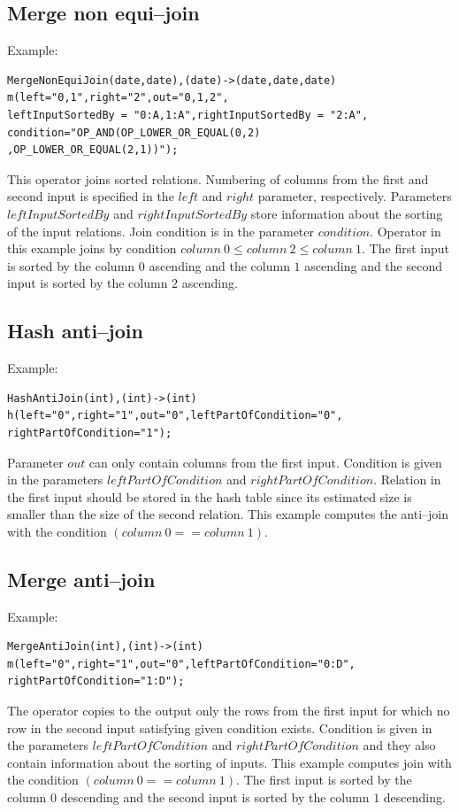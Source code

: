 \subsection{Merge non equi--join}
Example:
\begin{lstlisting}
MergeNonEquiJoin(date,date),(date)->(date,date,date)
m(left="0,1",right="2",out="0,1,2",
leftInputSortedBy = "0:A,1:A",rightInputSortedBy = "2:A",
condition="OP_AND(OP_LOWER_OR_EQUAL(0,2)
,OP_LOWER_OR_EQUAL(2,1))");
\end{lstlisting}

This operator joins sorted relations. Numbering of columns from the first and second input is specified in the $left$ and $right$ parameter, respectively. Parameters $leftInputSortedBy$ and $rightInputSortedBy$ store information about the sorting of the input relations. Join condition is in the parameter $condition$. Operator in this example joins by condition $column~0 \leq column~2\leq column~1$. The first input is sorted by the column $0$ ascending and the column $1$ ascending and the second input is sorted by the column $2$ ascending.

\subsection{Hash anti--join}
Example:
\begin{lstlisting}
HashAntiJoin(int),(int)->(int)
h(left="0",right="1",out="0",leftPartOfCondition="0",
rightPartOfCondition="1"); 
\end{lstlisting}

Parameter $out$ can only contain columns from the first input. Condition is given in the parameters $leftPartOfCondition$ and $rightPartOfCondition$.
Relation in the first input should be stored in the hash table since its estimated size is smaller than the size of the second relation. This example computes the anti--join with the condition $(column~0==column~1)$.

\subsection{Merge anti--join}
Example:
\begin{lstlisting}
MergeAntiJoin(int),(int)->(int)
m(left="0",right="1",out="0",leftPartOfCondition="0:D",
rightPartOfCondition="1:D");
\end{lstlisting}

The operator copies to the output only the rows from the first input for which no row in the second input satisfying given condition exists.
Condition is given in the parameters $leftPartOfCondition$ and $rightPartOfCondition$ and they also contain information about the sorting of inputs. This example computes join with the condition $(column~0==column~1)$. The first input is sorted by the column $0$ descending and the second input is sorted by the column $1$ descending.

